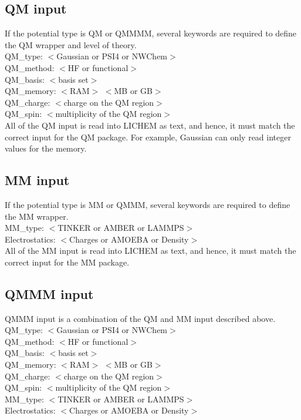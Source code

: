\documentclass[12pt]{report}
\begin{document}
\subsection{QM input}

If the potential type is QM or QMMMM, several keywords are required to define
the QM wrapper and level of theory. \\

QM\_type: $<$Gaussian or PSI4 or NWChem$>$ \\
QM\_method: $<$HF or functional$>$ \\
QM\_basis: $<$basis set$>$ \\
QM\_memory: $<$RAM$>$ $<$MB or GB$>$ \\
QM\_charge: $<$charge on the QM region$>$ \\
QM\_spin: $<$multiplicity of the QM region$>$ \\

All of the QM input is read into LICHEM as text, and hence, it must match the
correct input for the QM package. For example, Gaussian can only read integer
values for the memory.

\subsection{MM input}

If the potential type is MM or QMMM, several keywords are required to define
the MM wrapper. \\

MM\_type: $<$TINKER or AMBER or LAMMPS$>$ \\
Electrostatics: $<$Charges or AMOEBA or Density$>$ \\

All of the MM input is read into LICHEM as text, and hence, it must match the
correct input for the MM package.

\subsection{QMMM input}

QMMM input is a combination of the QM and MM input described above. \\

QM\_type: $<$Gaussian or PSI4 or NWChem$>$ \\
QM\_method: $<$HF or functional$>$ \\
QM\_basis: $<$basis set$>$ \\
QM\_memory: $<$RAM$>$ $<$MB or GB$>$ \\
QM\_charge: $<$charge on the QM region$>$ \\
QM\_spin: $<$multiplicity of the QM region$>$ \\
MM\_type: $<$TINKER or AMBER or LAMMPS$>$ \\
Electrostatics: $<$Charges or AMOEBA or Density$>$ \\
\end{document}
